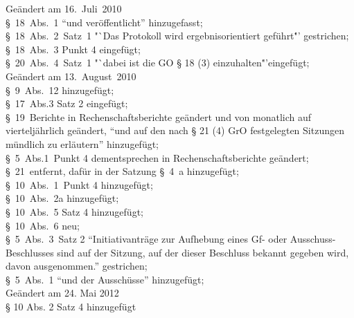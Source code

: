 Geändert am 16.~Juli~2010\\
§~18~Abs.~1 "`und veröffentlicht"' hinzugefasst;\\
§~18~Abs.~2~Satz~1 "`Das Protokoll wird ergebnisorientiert geführt\."' gestrichen;\\
§~18~Abs.~3 Punkt 4 eingefügt;\\
§~20~Abs.~4~Satz~1 "`dabei ist die GO § 18 (3) einzuhalten\."'eingefügt;\\

Geändert am 13.~August~2010\\
§~9~Abs.~12 hinzugefügt;\\
§~17~Abs.3 Satz 2 eingefügt;\\
§~19~Berichte in Rechenschaftsberichte geändert und von monatlich auf vierteljährlich geändert, "`und auf den nach § 21 (4) GrO festgelegten Sitzungen mündlich zu erläutern"' hinzugefügt;\\
§~5~Abs.1~Punkt 4 dementsprechen in Rechenschaftsberichte geändert;\\
§~21~entfernt, dafür in der Satzung §~4~a hinzugefügt;\\
§~10~Abs.~1~Punkt 4 hinzugefügt;\\
§~10~Abs.~2a hinzugefügt;\\
§~10~Abs.~5 Satz 4 hinzugefügt;\\
§~10~Abs.~6 neu;\\
§~5~Abs.~3~Satz 2 "`Initiativanträge zur Aufhebung eines Gf- oder Ausschuss-Beschlusses sind auf der Sitzung, auf der dieser Beschluss bekannt gegeben wird, davon ausgenommen."' gestrichen;\\
§~5~Abs.~1 "`und der Ausschüsse"' hinzugefügt;\\

Geändert am 24. Mai 2012\\
§ 10 Abs. 2 Satz 4 hinzugefügt\\

\normalsize
